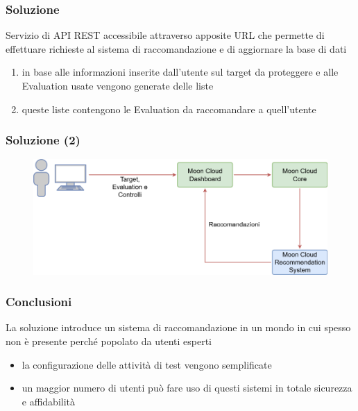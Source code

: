 \begin{frame}
\begin{columns}
\begin{column}{0.5\textwidth}
\begin{figure}
            \end{figure}
        \end{column}
    \end{columns}
\end{frame}

\begin{frame}
    \frametitle{Soluzione}
    Servizio di \alert{API REST} accessibile attraverso apposite URL che permette di effettuare richieste al sistema di 
    raccomandazione e di aggiornare la base di dati
    \begin{enumerate}
        \item in base alle informazioni inserite dall'utente sul \alert{target} da proteggere e alle Evaluation usate vengono generate delle 
        liste 
        \item queste liste contengono le Evaluation da raccomandare a quell'utente
    \end{enumerate}
\end{frame}

\begin{frame}
    \frametitle{Soluzione (2)}
    \begin{figure}
        \includegraphics[scale=0.32]{images/UML_MoonCloud_HowToDoPres}
    \end{figure}
\end{frame}

\begin{frame}
    \frametitle{Conclusioni}
    La soluzione introduce un sistema di raccomandazione in un mondo in cui spesso non è presente perché 
    popolato da utenti esperti
    \begin{itemize}
        \item la configurazione delle attività di test vengono semplificate
        \item un maggior numero di utenti può fare uso di questi sistemi in totale sicurezza e affidabilità
    \end{itemize}
\end{frame}


